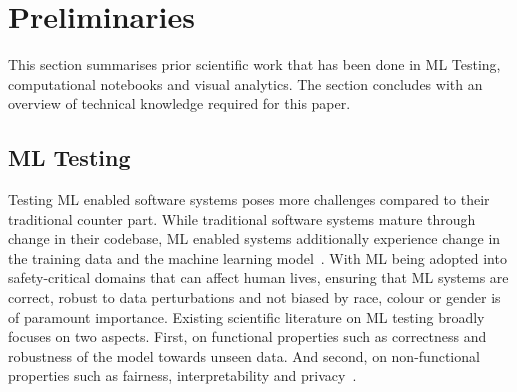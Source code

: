 


\section{Preliminaries}\label{sec:prelim}

This section summarises prior scientific work that has been done in ML
Testing, computational notebooks and visual analytics. The section
concludes with an overview of technical knowledge required for this
paper.

\subsection{ML Testing}\label{sec:ml-testing}

Testing ML enabled software systems poses more challenges compared to
their traditional counter part. While traditional software systems
mature through change in their codebase, ML enabled systems
additionally experience change in the training data and the machine
learning
model~\cite{sculley2015hidden,amershi2019software,sambasivan2021everyone}.
With ML being adopted into safety-critical domains that can affect
human lives, ensuring that ML systems are correct, robust to data
perturbations and not biased by race, colour or gender is of paramount
importance. Existing scientific literature on ML testing broadly
focuses on two aspects. First, on functional properties such as
correctness and robustness of the model towards unseen data. And
second, on non-functional properties such as fairness,
interpretability and
privacy~\cite{zhang2020machine,mehrabi2021survey,chen2022fairness}.

